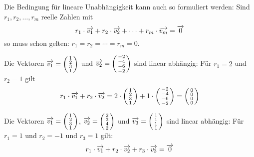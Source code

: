 \begin{notiz} Die Bedingung für lineare Unabhängigkeit kann auch so formuliert werden: Sind $r_1,  r_2, 
\ldots, r_m$ reelle Zahlen mit 
  	$$ r_1 \cdot \overrightarrow{v_1} + r_2 \cdot  \overrightarrow{v_2} + \cdots + r_m \cdot \overrightarrow{v_m} = \overrightarrow{0} $$
so muss schon gelten: $r_1 = r_2 = \cdots = r_m = 0$.
\end{notiz}

\begin{beispiel} Die Vektoren $\overrightarrow{v_1} = \left( \begin{smallmatrix} 1 \\ 2 \\ 3 \\ 1
\end{smallmatrix} \right)$ und $\overrightarrow{v_2} = \left( \begin{smallmatrix} -2 \\ -4 \\ -6 \\ -2 
\end{smallmatrix} \right)$ sind linear abhängig: Für $r_1 = 2$ und $r_2 = 1$ gilt
  	$$ r_1 \cdot \overrightarrow{v_1} + r_2 \cdot  \overrightarrow{v_2} =
     	2 \cdot \left( \begin{smallmatrix} 1 \\ 2 \\ 3 \\ 1 \end{smallmatrix} \right) + 
     	1 \cdot \left( \begin{smallmatrix} -2 \\ -4 \\ -6 \\ -2 \end{smallmatrix} \right) =
     	\left( \begin{smallmatrix} 0 \\ 0 \\ 0 \\ 0 \end{smallmatrix} \right) $$
\end{beispiel}

\begin{beispiel}\label{lin_ab_drei}
Die Vektoren  $\overrightarrow{v_1} = \left( \begin{smallmatrix} 1 \\ 2 \\ 3 \\ 1
\end{smallmatrix} \right)$, $\overrightarrow{v_2} = \left( \begin{smallmatrix} 2 \\ 3 \\ 4 \\ 2 
\end{smallmatrix} \right)$ und $\overrightarrow{v_3} = \left( \begin{smallmatrix} 1 \\ 1 \\ 1 \\ 1 
\end{smallmatrix} \right)$ sind linear abhängig: Für $r_1 = 1$ und $r_2 = -1$ und $r_3 = 1$ gilt:
  	$$  r_1 \cdot \overrightarrow{v_1} + r_2 \cdot  \overrightarrow{v_2} + r_3 \cdot \overrightarrow{v_3} =  \overrightarrow{0} $$
\end{beispiel} 

